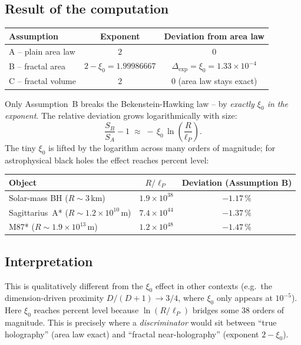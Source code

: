 \subsection*{Result of the computation}

\begin{center}
\begin{tabular}{lcc}
\toprule
Assumption & Exponent & Deviation from area law \\
\midrule
A -- plain area law   & $2$ & $0$ \\
B -- fractal area     & $2 - \xi_0 = 1.99986667$ & $\Delta_{\text{exp}} = \xi_0 = 1.33\times10^{-4}$ \\
C -- fractal volume   & $2$ & $0$ (area law stays exact) \\
\bottomrule
\end{tabular}
\end{center}

\medskip

\noindent
Only Assumption~B breaks the Bekenstein-Hawking law -- by \emph{exactly
$\xi_0$ in the exponent}. The relative deviation grows logarithmically with
size:
\[
\frac{S_B}{S_A} - 1 \;\approx\; -\,\xi_0 \,\ln\!\left(\frac{R}{\ell_P}\right).
\]
The tiny $\xi_0$ is lifted by the logarithm across many orders of magnitude;
for astrophysical black holes the effect reaches percent level:

\begin{center}
\begin{tabular}{lcc}
\toprule
Object & $R/\ell_P$ & Deviation (Assumption B) \\
\midrule
Solar-mass BH ($R\sim 3$\,km)         & $1.9\times10^{38}$ & $-1.17\,\%$ \\
Sagittarius~A* ($R\sim 1.2\times10^{10}$\,m) & $7.4\times10^{44}$ & $-1.37\,\%$ \\
M87* ($R\sim 1.9\times10^{13}$\,m)  & $1.2\times10^{48}$ & $-1.47\,\%$ \\
\bottomrule
\end{tabular}
\end{center}

\subsection*{Interpretation}

This is qualitatively different from the $\xi_0$ effect in other contexts
(e.g.\ the dimension-driven proximity $D/(D+1)\to 3/4$, where $\xi_0$ only
appears at $10^{-5}$). Here $\xi_0$ reaches percent level because
$\ln(R/\ell_P)$ bridges some $38$ orders of magnitude. This is precisely
where a \emph{discriminator} would sit between \enquote{true holography}
(area law exact) and \enquote{fractal near-holography} (exponent $2-\xi_0$).

